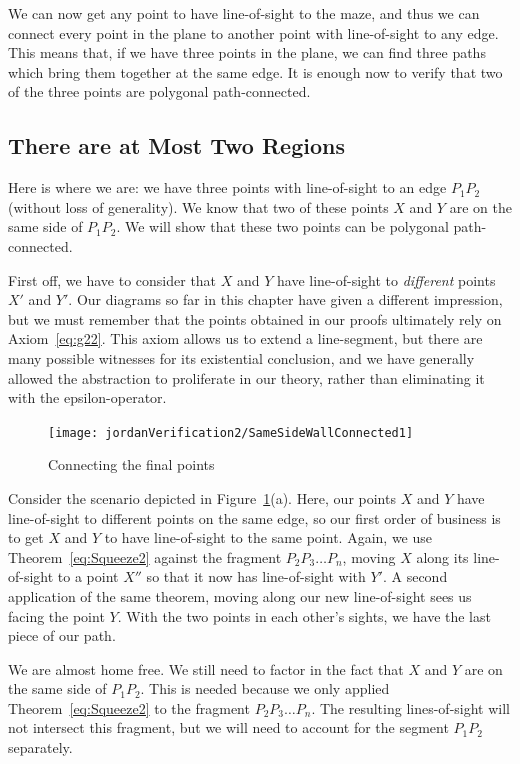 We can now get any point to have line-of-sight to the maze, and thus we can connect every point in the plane to another point with line-of-sight to any edge. This means that, if we have three points in the plane, we can find three paths which bring them together at the same edge. It is enough now to verify that two of the three points are polygonal path-connected.

\subsection{There are at Most Two Regions}\label{sec:SameSideEdgeConnected}
Here is where we are: we have three points with line-of-sight to an edge $P_1P_2$ (without loss of generality). We know that two of these points $X$ and $Y$ are on the same side of $P_1P_2$. We will show that these two points can be polygonal path-connected.

First off, we have to consider that $X$ and $Y$ have line-of-sight to \emph{different} points $X'$ and $Y'$. Our diagrams so far in this chapter have given a different impression, but we must remember that the points obtained in our proofs ultimately rely on Axiom~\ref{eq:g22}. This axiom allows us to extend a line-segment, but there are many possible witnesses for its existential conclusion, and we have generally allowed the abstraction to proliferate in our theory, rather than eliminating it with the epsilon-operator. 

\begin{figure}
\centering\texttt{[image: jordanVerification2/SameSideWallConnected1]}
\caption{Connecting the final points}
\label{fig:SameSideEdgeConnected}
\end{figure}

Consider the scenario depicted in Figure~\ref{fig:SameSideEdgeConnected}(a). Here, our points $X$ and $Y$ have line-of-sight to different points on the same edge, so our first order of business is to get $X$ and $Y$ to have line-of-sight to the same point. Again, we use Theorem~\ref{eq:Squeeze2} against the fragment $P_2P_3\ldots P_n$, moving $X$ along its line-of-sight to a point $X''$ so that it now has line-of-sight with $Y'$. A second application of the same theorem, moving along our new line-of-sight sees us facing the point $Y$. With the two points in each other's sights, we have the last piece of our path.

We are almost home free. We still need to factor in the fact that $X$ and $Y$ are on the same side of $P_1P_2$. This is needed because we only applied Theorem~\ref{eq:Squeeze2} to the fragment $P_2P_3\ldots P_n$. The resulting lines-of-sight will not intersect this fragment, but we will need to account for the segment $P_1P_2$ separately.

